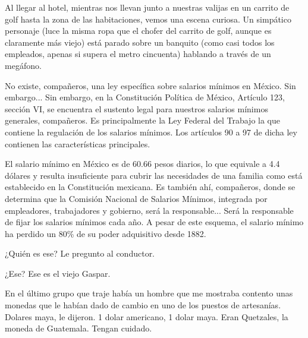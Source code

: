 \documentclass[12pt,twoside,openright,a5paper]{book}
\begin{document}
\vspace{0.5cm}

\hrulefill\hspace{0.2cm} \decofourleft\decofourright \hspace{0.2cm} \hrulefill
\vspace{0.5cm}


Al llegar al hotel,
mientras nos llevan junto a nuestras valijas en un carrito de golf hasta
la zona de las habitaciones, vemos una escena curiosa. Un simpático personaje
(luce la misma ropa que el chofer del carrito de golf, aunque es claramente
más viejo) está parado sobre un banquito (como casi todos los empleados,
apenas si supera el metro cincuenta) hablando a través de un megáfono.

No existe, compañeros, una ley específica sobre salarios mínimos en
México. Sin embargo... Sin embargo, en la Constitución Política de México,
Artículo 123, sección VI, se encuentra el sustento legal para nuestros
salarios mínimos generales, compañeros. Es principalmente la Ley Federal
del Trabajo la que contiene la regulación de los salarios mínimos. Los
artículos 90 a 97 de dicha ley contienen las características principales.

El salario mínimo en México es de 60.66 pesos diarios, lo que equivale
a 4.4 dólares y resulta insuficiente para cubrir las necesidades de una
familia como está establecido en la Constitución mexicana. Es también
ahí, compañeros, donde se determina que la Comisión Nacional de Salarios
Mínimos, integrada por empleadores, trabajadores y gobierno, será la
responsable... Será la responsable de fijar los salarios mínimos cada
año. A pesar de este esquema, el salario mínimo ha perdido un 80\% de su
poder adquisitivo desde 1882.

¿Quién es ese? Le pregunto al conductor.

¿Ese? Ese es el viejo Gaspar.


\vspace{0.5cm}

\hrulefill\hspace{0.2cm} \decofourleft\decofourright \hspace{0.2cm} \hrulefill
\vspace{0.5cm}

En el último grupo que traje había un hombre que me mostraba contento
unas monedas que le habían dado de cambio en uno de los puestos de
artesanías. Dolares maya, le dijeron. 1 dolar americano, 1 dolar maya. Eran
Quetzales, la moneda de Guatemala. Tengan cuidado.
\end{document}
